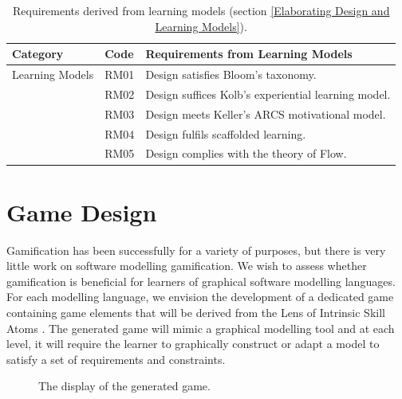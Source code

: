 \documentclass[12pt, a4paper]{report}
\begin{document}
\begin{table}[ht]
\caption{Requirements derived from learning models (section \ref{Elaborating Design and Learning Models}).}
\label{design-learning-models}
\begin{center}
\begin{tabular}{ p{2cm}p{1cm}p{10cm} } 
\hline
Category & Code & Requirements from Learning Models \\
\hline
\multirow{1}{2cm}{Learning Models} 
& RM01 & Design satisfies Bloom's taxonomy. \\
& RM02 & Design suffices Kolb's experiential learning model. \\ 
& RM03 & Design meets Keller's ARCS motivational model. \\
& RM04 & Design fulfils scaffolded learning. \\
& RM05 & Design complies with the theory of Flow. \\      
\hline
\end{tabular}
\end{center}
\end{table}


\section{Game Design}
Gamification has been successfully for a variety of purposes, but there is very little work on software modelling gamification. We wish to assess whether gamification is beneficial for learners of graphical software modelling languages. For each modelling language, we envision the development of a dedicated game containing game elements that will be derived from the Lens of Intrinsic Skill Atoms \cite{deterding2015lens}. The generated game will mimic a graphical modelling tool and at each level, it will require the learner to graphically construct or adapt a model to satisfy a set of requirements and constraints.

\begin{figure}[ht]
\centering
{}
\caption{The display of the generated game.}
\label{fig:001}
\end{figure}
\end{document}
